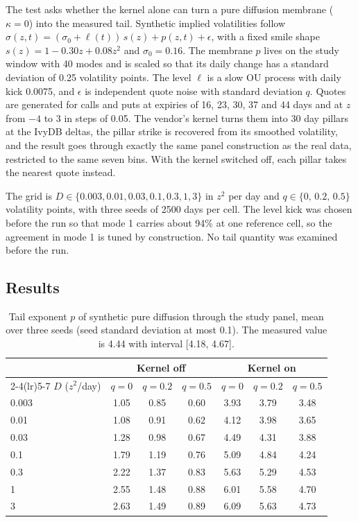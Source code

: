 \documentclass[11pt]{article}
\begin{document}
The test asks whether the kernel alone can turn a pure diffusion membrane ($\kappa=0$) into the measured tail. Synthetic implied volatilities follow $\sigma(z,t)=(\sigma_0+\ell(t))\,s(z)+p(z,t)+\epsilon$, with a fixed smile shape $s(z)=1-0.30z+0.08z^2$ and $\sigma_0=0.16$. The membrane $p$ lives on the study window with 40 modes and is scaled so that its daily change has a standard deviation of 0.25 volatility points. The level $\ell$ is a slow OU process with daily kick 0.0075, and $\epsilon$ is independent quote noise with standard deviation $q$. Quotes are generated for calls and puts at expiries of 16, 23, 30, 37 and 44 days and at $z$ from $-4$ to 3 in steps of 0.05. The vendor's kernel turns them into 30 day pillars at the IvyDB deltas, the pillar strike is recovered from its smoothed volatility, and the result goes through exactly the same panel construction as the real data, restricted to the same seven bins. With the kernel switched off, each pillar takes the nearest quote instead.

The grid is $D\in\{0.003,0.01,0.03,0.1,0.3,1,3\}$ in $z^2$ per day and $q\in\{0,\,0.2,\,0.5\}$ volatility points, with three seeds of 2500 days per cell. The level kick was chosen before the run so that mode 1 carries about 94\% at one reference cell, so the agreement in mode 1 is tuned by construction. No tail quantity was examined before the run.

\subsection{Results}

\begin{table}[t]
\centering
\caption{Tail exponent $p$ of synthetic pure diffusion through the study panel, mean over three seeds (seed standard deviation at most 0.1). The measured value is 4.44 with interval [4.18, 4.67].}
\label{tab:grid}
\begin{tabular}{lcccccc}
\toprule
& \multicolumn{3}{c}{Kernel off} & \multicolumn{3}{c}{Kernel on} \\
\cmidrule(lr){2-4}\cmidrule(lr){5-7}
$D$ ($z^2$/day) & $q=0$ & $q=0.2$ & $q=0.5$ & $q=0$ & $q=0.2$ & $q=0.5$ \\
\midrule
0.003 & 1.05 & 0.85 & 0.60 & 3.93 & 3.79 & 3.48 \\
0.01  & 1.08 & 0.91 & 0.62 & 4.12 & 3.98 & 3.65 \\
0.03  & 1.28 & 0.98 & 0.67 & 4.49 & 4.31 & 3.88 \\
0.1   & 1.79 & 1.19 & 0.76 & 5.09 & 4.84 & 4.24 \\
0.3   & 2.22 & 1.37 & 0.83 & 5.63 & 5.29 & 4.53 \\
1     & 2.55 & 1.48 & 0.88 & 6.01 & 5.58 & 4.70 \\
3     & 2.63 & 1.49 & 0.89 & 6.09 & 5.63 & 4.73 \\
\bottomrule
\end{tabular}
\end{table}
\end{document}
